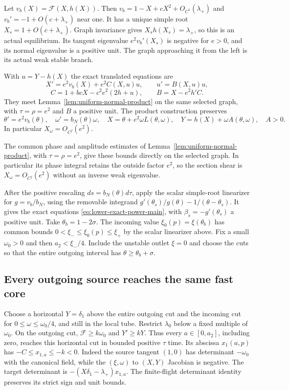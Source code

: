 Let $v_b(X)=\mathcal F(X,h(X))$. Then
$v_b=1-X+cX^2+O_{C^1}(\lambda_+)$ and
$v_b'=-1+O(c+\lambda_+)$ near one. It has a unique simple root
$X_s=1+O(c+\lambda_+)$. Graph invariance gives
$X_sh(X_s)=\lambda_+$, so this is an actual equilibrium.
Its tangent eigenvalue $e^2v_b'(X_s)$ is negative for $e>0$,
and its normal eigenvalue is a positive unit.
The graph approaching it from the left is its actual weak stable
branch.

With $u=Y-h(X)$ the exact translated equations are
\[
 X'=e^2v_b(X)+e^2C(X,u)u,\qquad u'=B(X,u)u,
\]
\[
 C=1+bcX-c^2e^2(2h+u),\qquad B=X-e^2h'C .
\]
They meet Lemma~\ref{lem:uniform-normal-product} on the same
selected graph, with $\tau=\rho=e^2$ and $B$ a positive unit.
The product construction preserves
\begin{equation}\label{eq:realizing-product}
 \theta'=e^2v_b(\theta),\quad \omega'=b_N(\theta)\omega,\quad
 X=\theta+e^2\omega L(\theta,\omega),\quad
 Y=h(X)+\omega A(\theta,\omega),\quad A>0 .
\end{equation}
In particular $X_\omega=O_{C^j}(e^2)$.

The common phase and amplitude estimates of
Lemma~\ref{lem:uniform-normal-product}, with $\tau=\rho=e^2$, give
these bounds directly on the selected graph. In particular its phase
integral retains the outside factor $e^2$, so the section shear is
$X_\omega=O_{C^j}(e^2)$ without an inverse weak eigenvalue.

After the positive rescaling $ds=b_N(\theta)d\tau$, apply the
scalar simple-root linearizer for
$g=v_b/b_N$, using the removable integrand
$g'(\theta_s)/g(\theta)-1/(\theta-\theta_s)$.
It gives the exact equations \eqref{eq:lower-exact-power-main},
with $\beta_s=-g'(\theta_s)$ a positive unit.
Take $\theta_b=1-2\sigma$. The incoming value
$\xi_0(p)=\xi(\theta_b)$ has common bounds
$0<\xi_-\le\xi_0(p)\le\xi_+$ by the scalar linearizer above.
Fix a small $\omega_0>0$ and then $a_2<\xi_-/4$.
Include the unstable outlet $\xi=0$ and choose the cuts so that
the entire outgoing interval has
$\theta\ge\theta_b+\sigma$.

\subsection{Every outgoing source reaches the same fast core}
Choose a horizontal $Y=\delta_1$ above the entire outgoing cut
and the incoming cut for $0\le\omega\le\omega_0/4$,
and still in the local tube. Restrict $\lambda_0$ below a fixed
multiple of $\omega_0$. On the outgoing cut,
$\mathcal F\ge k\omega_0$ and $Y'\ge kY$.
Thus every $a\in[0,a_2]$, including zero, reaches this horizontal
cut in bounded positive $\tau$ time.
Its abscissa $x_1(a,p)$ has $-C\le x_{1,a}\le-k<0$.
Indeed the source tangent $(1,0)$ has determinant
$-\omega_0$ with the canonical field, while the
$(\xi,\omega)$ to $(X,Y)$ Jacobian is negative.
The target determinant is
$-(X\delta_1-\lambda_+)x_{1,a}$.
The finite-flight determinant identity preserves its strict sign
and unit bounds.

